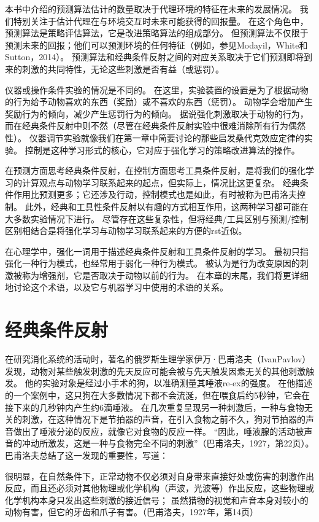 本书中介绍的预测算法估计的数量取决于代理环境的特征在未来的发展情况。
我们特别关注于估计代理在与环境交互时未来可能获得的回报量。
在这个角色中，预测算法是策略评估算法，它是改进策略算法的组成部分。
但预测算法不仅限于预测未来的回报；他们可以预测环境的任何特征（例如，参见Modayil，White和Sutton，2014）。
预测算法和经典条件反射之间的对应关系取决于它们预测即将到来的刺激的共同特性，无论这些刺激是否有益（或惩罚）。


仪器或操作条件实验的情况是不同的。
在这里，实验装置的设置是为了根据动物的行为给予动物喜欢的东西（奖励）或不喜欢的东西（惩罚）。
动物学会增加产生奖励行为的倾向，减少产生惩罚行为的倾向。
据说强化刺激取决于动物的行为，而在经典条件反射中则不然（尽管在经典条件反射实验中很难消除所有行为偶然性）。
仪器调节实验就像我们在第一章中简要讨论的那些启发桑代克效应定律的实验。
控制是这种学习形式的核心，它对应于强化学习的策略改进算法的操作。


在预测方面思考经典条件反射，在控制方面思考工具条件反射，是将我们的强化学习的计算观点与动物学习联系起来的起点，但实际上，情况比这更复杂。
经典条件作用比预测更多；它还涉及行动，控制模式也是如此，有时被称为巴甫洛夫控制。
此外，经典和工具性条件反射以有趣的方式相互作用，这两种学习都可能在大多数实验情况下进行。
尽管存在这些复杂性，但将经典/工具区别与预测/控制区别相结合是将强化学习与动物学习联系起来的方便的rst近似。


在心理学中，强化一词用于描述经典条件反射和工具条件反射的学习。
最初只指强化一种行为模式，也经常用于弱化一种行为模式。
被认为是行为改变原因的刺激被称为增强剂，它是否取决于动物以前的行为。
在本章的末尾，我们将更详细地讨论这个术语，以及它与机器学习中使用的术语的关系。


\section{经典条件反射}

在研究消化系统的活动时，著名的俄罗斯生理学家伊万·巴甫洛夫（IvanPavlov）发现，动物对某些触发刺激的先天反应可能会被与先天触发因素无关的其他刺激触发。
他的实验对象是经过小手术的狗，以准确测量其唾液re-ex的强度。
在他描述的一个案例中，这只狗在大多数情况下都不会流涎，但在喂食后约5秒钟，它会在接下来的几秒钟内产生约6滴唾液。
在几次重复呈现另一种刺激后，一种与食物无关的刺激，在这种情况下是节拍器的声音，在引入食物之前不久，狗对节拍器的声音做出了唾液分泌的反应，就像它对食物的反应一样。
“因此，唾液腺的活动被声音的冲动所激发，这是一种与食物完全不同的刺激”（巴甫洛夫，1927，第22页）。
巴甫洛夫总结了这一发现的重要性，写道：


很明显，在自然条件下，正常动物不仅必须对自身带来直接好处或伤害的刺激作出反应，而且还必须对其他物理或化学机构（声波，光波等）作出反应，这些物理或化学机构本身只发出这些刺激的接近信号；
虽然猎物的视觉和声音本身对较小的动物有害，但它的牙齿和爪子有害。（巴甫洛夫，1927年，第14页）


